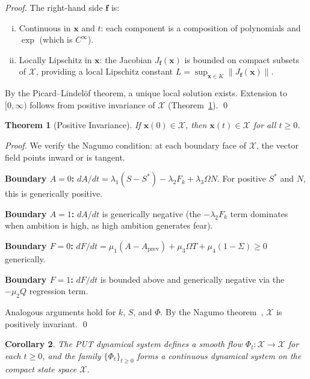 \documentclass[12pt,a4paper]{article}
\theoremstyle{plain}
\newtheorem{theorem}{Theorem}[section]
\newtheorem{corollary}[theorem]{Corollary}
\theoremstyle{definition}
\theoremstyle{remark}
\newcommand{\X}{\mathcal{X}}
\newcommand{\Fk}{F_k}
\begin{document}
\begin{proof}
The right-hand side $\mathbf{f}$ is:
\begin{enumerate}[(i),nosep]
  \item Continuous in $\mathbf{x}$ and $t$: each component is a composition of polynomials and $\exp$ (which is $C^\infty$).
  \item Locally Lipschitz in $\mathbf{x}$: the Jacobian $J_\mathbf{f}(\mathbf{x})$ is bounded on compact subsets of $\X$, providing a local Lipschitz constant $L = \sup_{\mathbf{x} \in K}\|J_\mathbf{f}(\mathbf{x})\|$.
\end{enumerate}
By the Picard--Lindel\"of theorem, a unique local solution exists. Extension to $[0,\infty)$ follows from positive invariance of $\X$ (Theorem~\ref{thm:invariance}). \qed
\end{proof}

\begin{theorem}[Positive Invariance]\label{thm:invariance}
If $\mathbf{x}(0) \in \X$, then $\mathbf{x}(t) \in \X$ for all $t \geq 0$.
\end{theorem}

\begin{proof}
We verify the Nagumo condition: at each boundary face of $\X$, the vector field points inward or is tangent.

\textbf{Boundary $A = 0$:} $dA/dt = \lambda_1(S-S^*) - \lambda_2\Fk + \lambda_3\Omega N$. For positive $S^*$ and $N$, this is generically positive.

\textbf{Boundary $A = 1$:} $dA/dt$ is generically negative (the $-\lambda_2\Fk$ term dominates when ambition is high, as high ambition generates fear).

\textbf{Boundary $F = 0$:} $dF/dt = \mu_1(A-A_{\mathrm{prev}}) + \mu_3\Omega T + \mu_4(1-\Sigma) \geq 0$ generically.

\textbf{Boundary $F = 1$:} $dF/dt$ is bounded above and generically negative via the $-\mu_2 Q$ regression term.

Analogous arguments hold for $k$, $S$, and $\Phi$. By the Nagumo theorem~\cite{nagumo1942}, $\X$ is positively invariant. \qed
\end{proof}

\begin{corollary}
The PUT dynamical system defines a smooth flow $\Phi_t: \X \to \X$ for each $t \geq 0$, and the family $\{\Phi_t\}_{t \geq 0}$ forms a continuous dynamical system on the compact state space $\X$.
\end{corollary}
\end{document}
